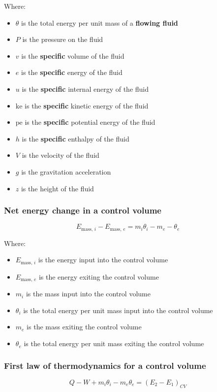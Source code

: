 \documentclass[11pt]{article}
\begin{document}
Where:
\begin{itemize}
\item \(\theta\) is the total energy per unit mass of a \textbf{flowing fluid}
\item \(P\) is the pressure on the fluid
\item \(v\) is the \textbf{specific} volume of the fluid
\item \(e\) is the \textbf{specific} energy of the fluid
\item \(u\) is the \textbf{specific} internal energy of the fluid
\item \(\text{ke}\) is the \textbf{specific} kinetic energy of the fluid
\item \(\text{pe}\) is the \textbf{specific} potential energy of the fluid
\item \(h\) is the \textbf{specific} enthalpy of the fluid
\item \(V\) is the velocity of the fluid
\item \(g\) is the gravitation acceleration
\item \(z\) is the height of the fluid
\end{itemize}

\subsubsection{Net energy change in a control volume}
\label{sec:org98d6088}
\[E_{\text{mass, } i} - E_{\text{mass, } e} = m_i \theta_i - m_e - \theta_e\]

Where:
\begin{itemize}
\item \(E_{\text{mass, } i}\) is the energy input into the control volume
\item \(E_{\text{mass, } e}\) is the energy exiting the control volume
\item \(m_i\) is the mass input into the control volume
\item \(\theta_i\) is the total energy per unit mass input into the control volume
\item \(m_e\) is the mass exiting the control volume
\item \(\theta_e\) is the total energy per unit mass exiting the control volume
\end{itemize}

\subsubsection{First law of thermodynamics for a control volume}
\label{sec:org14a797b}
\[Q - W + m_i \theta_i - m_e \theta_e = \left(E_2 - E_1 \right)_{CV}\]
\end{document}
